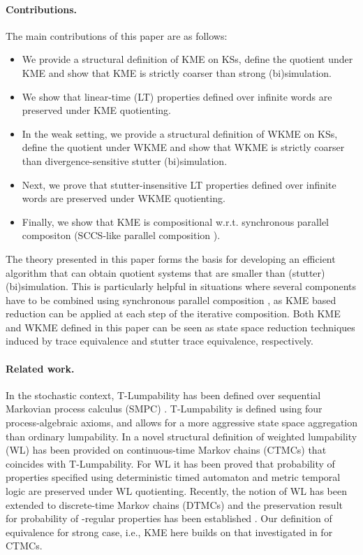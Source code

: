 \documentclass{llncs}
\newcommand{\<}{\langle}
\renewcommand{\>}{\rangle}
\begin{document}
\paragraph*{Contributions.} The main contributions of this paper are as follows:
\begin{itemize}
 \item We provide a structural definition of KME on KSs, define the quotient under KME and show that KME is strictly coarser than strong (bi)simulation.
 \item We show that linear-time (LT) properties defined over infinite words are preserved under KME quotienting. 
 \item In the weak setting, we provide a structural definition of WKME on KSs, define the quotient under WKME and show that WKME is strictly coarser than divergence-sensitive stutter (bi)simulation.
 \item Next, we prove that stutter-insensitive LT properties defined over infinite words are preserved under WKME quotienting. 
 \item Finally, we show that KME is compositional w.r.t. synchronous parallel compositon (SCCS-like parallel composition \cite{CCMilner83}).    
\end{itemize}
The theory presented in this paper forms the basis for developing an efficient algorithm that can obtain quotient systems that are smaller than (stutter) (bi)simulation. This is particularly helpful in situations where several components have to be combined using synchronous parallel composition \cite{CCMilner83}, as KME based reduction can be applied at each step of the iterative composition. Both KME and WKME defined in this paper can be seen as state space reduction techniques induced by trace equivalence and stutter trace equivalence, respectively.                                      
\paragraph*{Related work.} In the stochastic context, T-Lumpability has been defined over sequential Markovian process calculus (SMPC) \cite{BM08}. T-Lumpability is defined using four process-algebraic axioms, and allows for a more aggressive state space aggregation than ordinary lumpability. In \cite{SK11} a novel structural definition of  weighted lumpability (WL) has been provided on continuous-time Markov chains (CTMCs) that coincides with T-Lumpability. For WL it has been proved that probability of properties specified using deterministic timed automaton and metric temporal logic are preserved under WL quotienting. Recently, the notion of WL has been extended to discrete-time Markov chains (DTMCs) and the preservation result for probability of -regular properties has been established \cite{Sharma12}. Our definition of equivalence for strong case, i.e., KME here builds on that investigated in \cite{SK11} for CTMCs.                       
\end{document}
